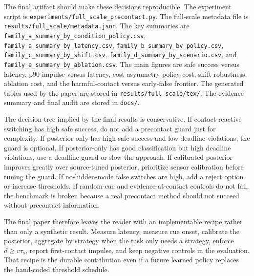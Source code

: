 \documentclass{article}
\begin{document}
The final artifact should make these decisions reproducible. The experiment script is \texttt{experiments/full\_scale\_precontact.py}. The full-scale metadata file is \texttt{results/full\_scale/metadata.json}. The key summaries are \texttt{family\_a\_summary\_by\_condition\_policy.csv}, \texttt{family\_a\_summary\_by\_latency.csv}, \texttt{family\_b\_summary\_by\_policy.csv}, \texttt{family\_c\_summary\_by\_shift.csv}, \texttt{family\_d\_summary\_by\_scenario.csv}, and \texttt{family\_e\_summary\_by\_ablation.csv}. The main figures are safe success versus latency, p90 impulse versus latency, cost-asymmetry policy cost, shift robustness, ablation cost, and the harmful-contact versus early-false frontier. The generated tables used by the paper are stored in \texttt{results/full\_scale/tex/}. The evidence summary and final audit are stored in \texttt{docs/}.

The decision tree implied by the final results is conservative. If contact-reactive switching has high safe success, do not add a precontact guard just for complexity. If posterior-only has high safe success and low deadline violations, the guard is optional. If posterior-only has good classification but high deadline violations, use a deadline guard or slow the approach. If calibrated posterior improves greatly over source-tuned posterior, prioritize sensor calibration before tuning the guard. If no-hidden-mode false switches are high, add a reject option or increase thresholds. If random-cue and evidence-at-contact controls do not fail, the benchmark is broken because a real precontact method should not succeed without precontact information.

The final paper therefore leaves the reader with an implementable recipe rather than only a synthetic result. Measure latency, measure cue onset, calibrate the posterior, aggregate by strategy when the task only needs a strategy, enforce $d\geq v\tau_s$, report first-contact impulse, and keep negative controls in the evaluation. That recipe is the durable contribution even if a future learned policy replaces the hand-coded threshold schedule.
\end{document}
